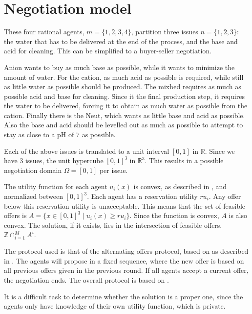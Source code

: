 \section{Negotiation model}
\label{sec:design:negmod}
These four rational agents, $m = \{1,2,3, 4\}$, partition three issues $n=\{1,2,3\}$: the water that has to be delivered at the end of the process, and the base and acid for cleaning.  This can be simplified to a buyer-seller negotiation.

Anion wants to buy as much base as possible, while it wants to minimize the amount of water. For the cation, as much acid as possible is required, while still as little water as possible should be produced. The mixbed requires as much as possible acid and base for cleaning. Since it the final production step, it requires the water to be delivered, forcing it to obtain as much water as possible from the cation. Finally there is the Neut, which wants as little base and acid as possible. Also the base and acid should be levelled out as much as possible to attempt to stay as close to a pH of $7$ as possible. 

Each of the above issues is translated to a unit interval $[0, 1]$ in $\mathbb{R}$. Since we have $3$ issues, the unit hypercube $[0, 1]^3$ in  $\mathbb{R}^3$. This results in a possible negotiation domain $\Omega = [0,1]$ per issue.

The utility function for each agent $u_i(x)$ is convex, as described in , and normalized between $[0, 1]^3$. Each agent has a reservation utility $ru_i$. Any offer below this reservation utility is unacceptable. This means that the set of feasible offers is $A = \{ x\in [0,1]^3 \mid u_i(x)\geq ru_i\}$. Since the function is convex, $A$ is also convex. The solution, if it exists, lies in the intersection of feasible offers, $\mathbb{Z} \cap^M_{i=1}A^i$.

The protocol used is that of the alternating offers protocol, based on \citep{rubinstein1982perfect} as described in . The agents will propose in a fixed sequence, where the new offer is based on all previous offers given in the previous round. If all agents accept a current offer, the negotiation ends. The overall protocol is based on \citep{zheng2015automated}. 

It is a difficult task to determine whether the solution is a proper one, since the agents only have knowledge of their own utility function, which is private. 


